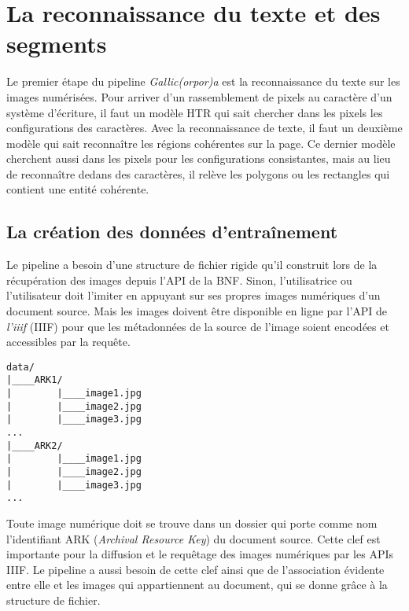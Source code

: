 \documentclass[class=article, crop=false]{standalone}
\begin{document}
\section{La reconnaissance du texte et des segments}

Le premier étape du pipeline \textit{Gallic(orpor)a} est la reconnaissance du texte sur les images numérisées. Pour arriver d'un rassemblement de pixels au caractère d'un système d'écriture, il faut un modèle HTR qui sait chercher dans les pixels les configurations des caractères. Avec la reconnaissance de texte, il faut un deuxième modèle qui sait reconnaître les régions cohérentes sur la page. Ce dernier modèle cherchent aussi dans les pixels pour les configurations consistantes, mais au lieu de reconnaître dedans des caractères, il relève les polygons ou les rectangles qui contient une entité cohérente.

\subsection{La création des données d'entraînement}

Le pipeline a besoin d'une structure de fichier rigide qu'il construit lors de la récupération des images depuis l'API de la \acrshort{BNF}. Sinon, l'utilisatrice ou l'utilisateur doit l'imiter en appuyant sur ses propres images numériques d'un document source. Mais les images doivent être disponible en ligne par l'API de \textit{l'\Gls{iiif}} (\acrshort{IIIF}) pour que les métadonnées de la source de l'image soient encodées et accessibles par la requête.

\begin{center}
\begin{verbatim}
data/
|____ARK1/
|        |____image1.jpg
|        |____image2.jpg
|        |____image3.jpg
...
|____ARK2/
|        |____image1.jpg
|        |____image2.jpg
|        |____image3.jpg
...
\end{verbatim}
\end{center}

\noindent Toute image numérique doit se trouve dans un dossier qui porte comme nom l'identifiant ARK (\textit{Archival Resource Key}) du document source. Cette clef est importante pour la diffusion et le requêtage des images numériques par les APIs \acrshort{IIIF}. Le pipeline a aussi besoin de cette clef ainsi que de l'association évidente entre elle et les images qui appartiennent au document, qui se donne grâce à la structure de fichier.
\end{document}
